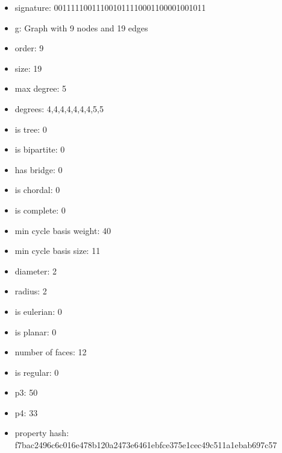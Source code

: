 \newpage
\begin{figure}
\end{figure}
\begin{itemize}
\item signature: 001111100111001011110001100001001011
\item g: Graph with 9 nodes and 19 edges
\item order: 9
\item size: 19
\item max degree: 5
\item degrees: 4,4,4,4,4,4,4,5,5
\item is tree: 0
\item is bipartite: 0
\item has bridge: 0
\item is chordal: 0
\item is complete: 0
\item min cycle basis weight: 40
\item min cycle basis size: 11
\item diameter: 2
\item radius: 2
\item is eulerian: 0
\item is planar: 0
\item number of faces: 12
\item is regular: 0
\item p3: 50
\item p4: 33
\item property hash: f7bac2496c6c016e478b120a2473e6461ebfce375e1cec49c511a1ebab697c57
\end{itemize}
